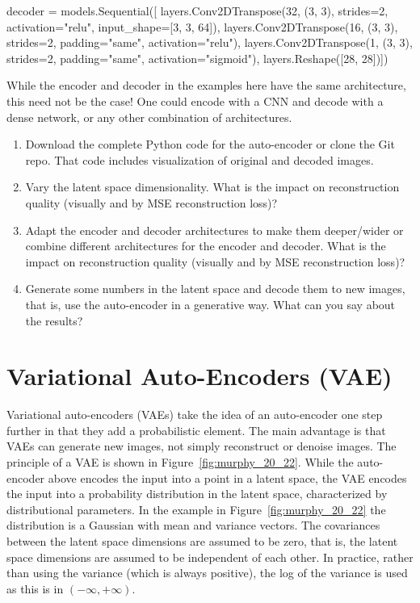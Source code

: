 \begin{pythoncode}
decoder = models.Sequential([
    layers.Conv2DTranspose(32, (3, 3), strides=2, 
               activation="relu", input_shape=[3, 3, 64]),
    layers.Conv2DTranspose(16, (3, 3), strides=2, 
               padding="same", activation="relu"),
    layers.Conv2DTranspose(1, (3, 3), strides=2, 
               padding="same", activation="sigmoid"),
    layers.Reshape([28, 28])])
\end{pythoncode}


\begin{infobox}
While the encoder and decoder in the examples here have the same architecture, this need not be the case! One could encode with a CNN and decode with a dense network, or any other combination of architectures.
\end{infobox}


\begin{exercisebox}
\begin{enumerate}
  \item Download the complete Python code for the auto-encoder or clone the Git repo. That code includes visualization of original and decoded images.
  \item Vary the latent space dimensionality. What is the impact on reconstruction quality (visually and by MSE reconstruction loss)?
  \item Adapt the encoder and decoder architectures to make them deeper/wider or combine different architectures for the encoder and decoder. What is the impact on reconstruction quality (visually and by MSE reconstruction loss)?
  \item Generate some numbers in the latent space and decode them to new images, that is, use the auto-encoder in a generative way. What can you say about the results?
\end{enumerate}
\end{exercisebox}


\FloatBarrier

\section{Variational Auto-Encoders (VAE)}
\label{sec:vae}

Variational auto-encoders (VAEs) take the idea of an auto-encoder one step further in that they add a probabilistic element. The main advantage is that VAEs can generate new images, not simply reconstruct or denoise images. The principle of a VAE is shown in Figure~\ref{fig:murphy_20_22}. While the auto-encoder above encodes the input into a point in a latent space, the VAE encodes the input into a probability distribution in the latent space, characterized by distributional parameters. In the example in Figure~\ref{fig:murphy_20_22} the distribution is a Gaussian with mean and variance vectors. The covariances between the latent space dimensions are assumed to be zero, that is, the latent space dimensions are assumed to be independent of each other. In practice, rather than using the variance (which is always positive), the log of the variance is used as this is in $(-\infty, +\infty)$.

